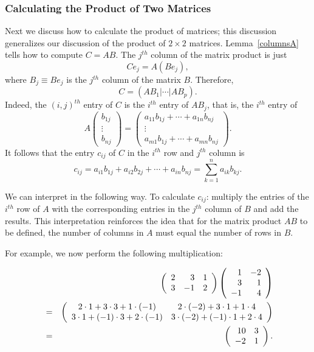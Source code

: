 \documentclass{ximera}
\begin{document}
\subsubsection*{Calculating the Product of Two Matrices}

Next we discuss how to calculate the product of matrices; this
discussion generalizes our discussion of the product of $2\times 2$
matrices.  Lemma~\ref{columnsA} tells how to compute $C=AB$.  The $j^{th}$
column of the matrix product is just
\[
Ce_j = A(Be_j),
\]
where $B_j\equiv Be_j$ is the $j^{th}$ column of the matrix $B$.  Therefore,
\begin{equation}  \label{E:matprod}
C = (AB_1|\cdots|AB_p).
\end{equation}
Indeed, the $(i,j)^{th}$ entry of $C$ is the $i^{th}$ entry of $AB_j$,
that is, the $i^{th}$ entry of
\[
A\left(\begin{array}{c} b_{1j}\\ \vdots\\
b_{nj}\end{array}\right)
=
\left(\begin{array}{c} a_{11}b_{1j} + \cdots + a_{1n}b_{nj} \\
\vdots \\ a_{m1}b_{1j} + \cdots + a_{mn}b_{nj}
\end{array}\right).
\]
It follows that the entry $c_{ij}$ of $C$ in the $i^{th}$ row and
$j^{th}$ column is
\begin{equation} \label{multij}
c_{ij} = a_{i1}b_{1j} + a_{i2}b_{2j} + \cdots + a_{in}b_{nj} =
\sum_{k=1}^n a_{ik}b_{kj}.
\end{equation}

We can interpret  in the following way.  To calculate $c_{ij}$:
multiply the entries of the $i^{th}$ row of $A$ with the corresponding
entries in the $j^{th}$ column of $B$ and add the results.  This
interpretation reinforces the
idea that for the matrix product $AB$ to be defined, the number of columns
in $A$ must equal the number of rows in $B$.

For example, we now perform the following multiplication:

\begin{eqnarray*}
& & \left(\begin{array}{rrr} 2 & 3 & 1 \\ 3 & -1 & 2 \end{array}\right)
\left(\begin{array}{rr} 1 & -2 \\ 3 & 1 \\ -1 & 4 \end{array}\right)\\
& = & \left(\begin{array}{cc} 2\cdot 1+3\cdot 3 + 1\cdot(-1) & 2\cdot(-2)+3\cdot 1+1\cdot 4\\ 3\cdot 1 + (-1)\cdot 3+2\cdot(-1) &3\cdot(-2)+(-1)\cdot 1+2\cdot 4\end{array}\right)\\
& = & \left(\begin{array}{rr} 10 & 3\\ -2 &1\end{array}\right).
\end{eqnarray*}
\end{document}
